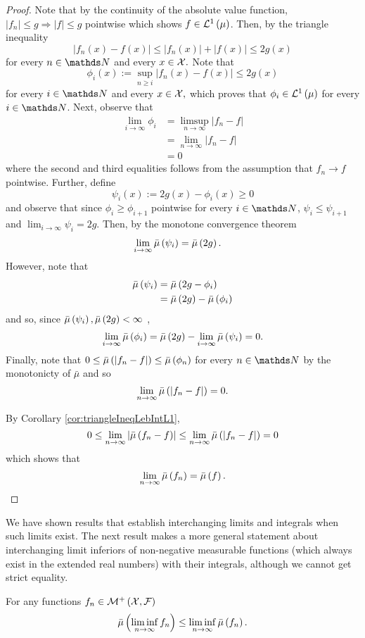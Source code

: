 \begin{proof}
Note that by the continuity of the absolute value function, $\left|f_{n}\right|\leq g\Longrightarrow\left|f\right|\leq g$
pointwise which shows $f\in\mathcal{L}^{1}\left(\mu\right)$. Then, by the triangle inequality
\[
\left|f_{n}\left(x\right)-f\left(x\right)\right|\leq\left|f_{n}\left(x\right)\right|+\left|f\left(x\right)\right|\leq2g\left(x\right)
\]
for every $n\in\N$ and every $x\in\mathcal{X}.$ Note that
\[
\phi_{i}\left(x\right):=\sup_{n\geq i}\left|f_{n}\left(x\right)-f\left(x\right)\right|\leq2g\left(x\right)
\]
for every $i\in\N$ and every $x\in\mathcal{X},$ which proves that $\phi_{i}\in\mathcal{L}^{1}\left(\mu\right)$
for every $i\in\N$. Next, observe that 
\begin{align*}
\lim_{i\to\infty}\phi_{i} & =\limsup_{n\to\infty}\left|f_{n}-f\right|\\
 & =\lim_{n\to\infty}\left|f_{n}-f\right|\\
 & =0
\end{align*}
where the second and third equalities follows from the assumption
that $f_{n}\longrightarrow f$ pointwise. Further, define
\[
\psi_{i}\left(x\right):=2g\left(x\right)-\phi_{i}\left(x\right)\geq0
\]
and observe that since $\phi_{i}\geq\phi_{i+1}$ pointwise for every
$i\in\N$, $\psi_{i}\leq\psi_{i+1}$ and $\lim_{i\to\infty}\psi_{i}=2g$.
Then, by the monotone convergence theorem
\begin{align*}
\lim_{i\to\infty}\bar{\mu}\left(\psi_{i}\right) & =\bar{\mu}\left(2g\right).
\end{align*}
However, note that
\begin{align*}
\bar{\mu}\left(\psi_{i}\right) & =\bar{\mu}\left(2g-\phi_{i}\right)\\
 & =\bar{\mu}\left(2g\right)-\bar{\mu}\left(\phi_{i}\right)
\end{align*}
and so, since $\bar{\mu}\left(\psi_{i}\right),\bar{\mu}\left(2g\right)<\infty$ ,
\[
\lim_{i\to\infty}\bar{\mu}\left(\phi_{i}\right)=\bar{\mu}\left(2g\right)-\lim_{i\to\infty}\bar{\mu}\left(\psi_{i}\right)=0.
\]
Finally, note that $0\leq\bar{\mu}\left(\left|f_{n}-f\right|\right)\leq\bar{\mu}\left(\phi_{n}\right)$
for every $n\in\N$ by the monotonicty of $\bar{\mu}$ and so 
\[
\lim_{n\to\infty}\bar{\mu}\left(\left|f_{n}-f\right|\right)=0.
\]

By Corollary \ref{cor:triangleIneqLebIntL1},
\[
0\leq\lim_{n\to\infty}\left|\bar{\mu}\left(f_{n}-f\right)\right|\leq\lim_{n\to\infty}\bar{\mu}\left(\left|f_{n}-f\right|\right)=0
\]
which shows that 
\[
\lim_{n\to\infty}\bar{\mu}\left(f_{n}\right)=\bar{\mu}\left(f\right).
\]
\end{proof}
We have shown results that establish interchanging limits and integrals
when such limits exist. The next result makes a more general statement
about interchanging limit inferiors of non-negative measurable functions
(which always exist in the extended real numbers) with their integrals,
although we cannot get strict equality.
\begin{thm}
\label{thm:fatouLemmaLebInt}For any functions $f_{n}\in\mathcal{M}^{+}\left(\mathcal{X},\mathcal{F}\right)$
\[
\bar{\mu}\left(\liminf_{n\to\infty}f_{n}\right)\leq\liminf_{n\to\infty}\bar{\mu}\left(f_{n}\right).
\]
\end{thm}

